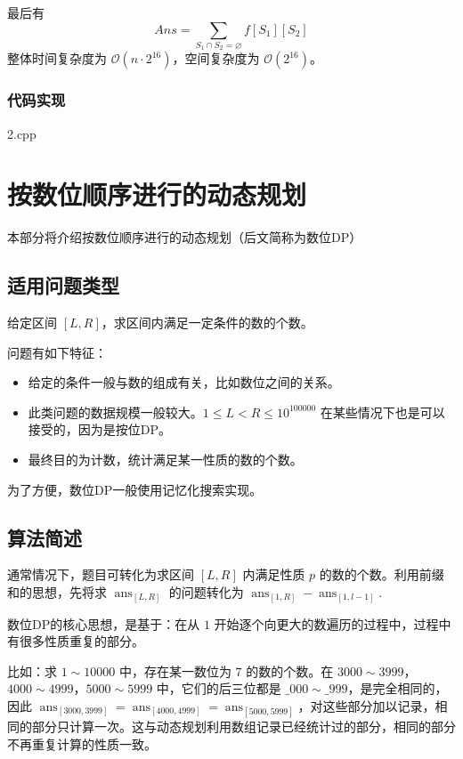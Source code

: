 \documentclass[a4paper, UTF8]{ctexart}
\begin{document}
最后有 \[
Ans=\sum_{S_1\cap S_2 = \varnothing}f[S_1][S_2]
\] 整体时间复杂度为 \(\mathcal{O}(n\cdot 2^{16})\)，空间复杂度为
\(\mathcal{O}(2^{16})\)。

\subsubsection{代码实现}

2.cpp

\section{按数位顺序进行的动态规划}

本部分将介绍按数位顺序进行的动态规划（后文简称为数位DP）

\subsection{适用问题类型}

给定区间 \([L,R]\)，求区间内满足一定条件的数的个数。

问题有如下特征：

\begin{itemize}
\item
  给定的条件一般与数的组成有关，比如数位之间的关系。
\item
  此类问题的数据规模一般较大。\(1\leq L<R\leq 10^{100000}\)
  在某些情况下也是可以接受的，因为是按位DP。
\item
  最终目的为计数，统计满足某一性质的数的个数。
\end{itemize}

为了方便，数位DP一般使用记忆化搜索实现。

\subsection{算法简述}

通常情况下，题目可转化为求区间 \([L, R]\) 内满足性质 \(p\)
的数的个数。利用前缀和的思想，先将求 \(\operatorname{ans}_{[L,R]}\)
的问题转化为
\(\operatorname{ans}_{[1,R]}-\operatorname{ans}_{[1,l-1]}\).

数位DP的核心思想，是基于：在从 \(1\)
开始逐个向更大的数遍历的过程中，过程中有很多性质重复的部分。

比如：求 \(1\sim 10000\) 中，存在某一数位为 \(7\) 的数的个数。在
\(3000\sim3999\)，\(4000\sim4999\)，\(5000\sim 5999\)
中，它们的后三位都是 \(\_000\sim \_ 999\)，是完全相同的，因此
\(\operatorname{ans}_{[3000,3999]}=\operatorname{ans}_{[4000,4999]}=\operatorname{ans}_{[5000,5999]}\)，对这些部分加以记录，相同的部分只计算一次。这与动态规划利用数组记录已经统计过的部分，相同的部分不再重复计算的性质一致。
\end{document}
